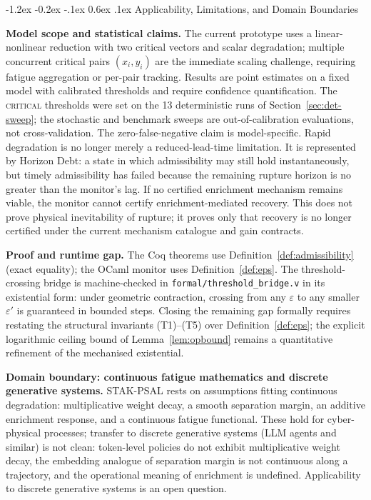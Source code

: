 \documentclass{llncs}
\makeatletter
\renewcommand\section{\@startsection{section}{1}{\z@}%
  {-1.2ex \@plus -0.2ex \@minus -.1ex}%
  {0.6ex \@plus .1ex}%
  {\normalfont\large\bfseries}}
\newcommand{\st}[1]{\textup{\textsc{#1}}}
\makeatother
\begin{document}
\section{Applicability, Limitations, and Domain Boundaries}
\label{sec:limits}

\textbf{Model scope and statistical claims.} The current prototype uses
a linear-nonlinear reduction with two critical vectors and scalar
degradation; multiple concurrent critical pairs $(x_i, y_i)$ are the
immediate scaling challenge, requiring fatigue aggregation or per-pair
tracking. Results are point estimates on a fixed model with calibrated
thresholds and require confidence quantification. The \st{critical}
thresholds were set on the 13 deterministic runs of
Section~\ref{sec:det-sweep}; the stochastic and benchmark sweeps are
out-of-calibration evaluations, not cross-validation. The
zero-false-negative claim is model-specific. Rapid degradation is no longer merely a reduced-lead-time limitation. It is represented by Horizon Debt: a state in which admissibility may still hold instantaneously, but timely admissibility has failed because the remaining rupture horizon is no greater than the monitor's lag. If no certified enrichment mechanism remains viable, the monitor cannot certify enrichment-mediated recovery. This does not prove physical inevitability of rupture; it proves only that recovery is no longer certified under the current mechanism catalogue and gain contracts.

\textbf{Proof and runtime gap.} The Coq theorems use
Definition~\ref{def:admissibility} (exact equality); the OCaml monitor
uses Definition~\ref{def:eps}. The threshold-crossing bridge is
machine-checked in \texttt{formal/\allowbreak{}threshold\_bridge.v} in its
existential form: under geometric contraction, crossing from any
$\varepsilon$ to any smaller $\varepsilon'$ is guaranteed in bounded
steps. Closing the remaining gap formally requires restating the
structural invariants (T1)--(T5) over Definition~\ref{def:eps}; the
explicit logarithmic ceiling bound of Lemma~\ref{lem:opbound} remains a
quantitative refinement of the mechanised existential.

\textbf{Domain boundary: continuous fatigue mathematics and discrete
generative systems.} STAK-PSAL rests on assumptions fitting continuous
degradation: multiplicative weight decay, a smooth separation margin,
an additive enrichment response, and a continuous fatigue functional.
These hold for cyber-physical processes; transfer to discrete generative
systems (LLM agents and similar) is not clean: token-level policies do
not exhibit multiplicative weight decay, the embedding analogue of
separation margin is not continuous along a trajectory, and the
operational meaning of enrichment is undefined. Applicability to
discrete generative systems is an open question.
\end{document}
